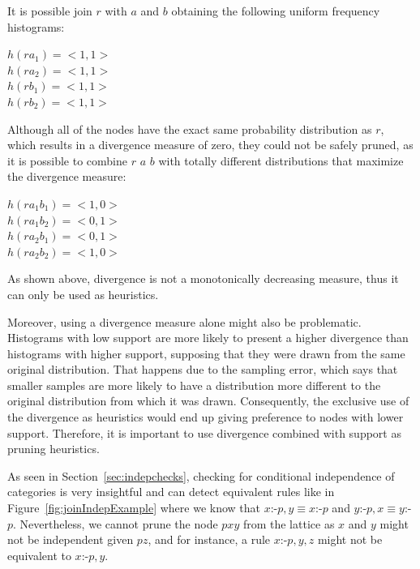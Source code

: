It is possible join $r$ with $a$ and $b$ obtaining the following uniform frequency histograms:

\begin{center}
$h(ra_1)=<1,1>$ \\
$h(ra_2)=<1,1>$ \\
$h(rb_1)=<1,1>$ \\
$h(rb_2)=<1,1>$
\end{center}

Although all of the nodes have the exact same probability distribution as $r$, which results in a divergence measure of
zero, they could not be safely pruned, as it is possible to combine $r$ $a$ $b$ with totally different distributions
that maximize the divergence measure:

\begin{center}
$h(ra_1b_1)=<1,0>$ \\
$h(ra_1b_2)=<0,1>$ \\
$h(ra_2b_1)=<0,1>$ \\
$h(ra_2b_2)=<1,0>$
\end{center}

As shown above, divergence is not a monotonically decreasing measure, thus it can only be used as heuristics.


Moreover, using a divergence measure alone might also be problematic. Histograms with low support are more likely to
present a higher divergence than histograms with higher support, supposing that they were drawn from the same original
distribution. That happens due to the sampling error, which says that smaller samples are more likely to have a
distribution more different to the original distribution from which it was drawn. Consequently, the exclusive use of
the divergence as heuristics would end up giving preference to nodes with lower support. Therefore, it is important to
use divergence combined with support as pruning heuristics.




As seen in Section~\ref{sec:indepchecks}, checking for conditional independence of categories is very insightful
and can detect equivalent rules like in Figure~\ref{fig:joinIndepExample} where we know that 
$x$:-$p,y \equiv x$:-$p$ and $y$:-$p,x \equiv y$:-$p$. Nevertheless, we cannot prune the
node $pxy$ from the lattice as $x$ and $y$ might not be independent given $pz$, and for instance, a rule $x$:-$p,y,z$
might not be equivalent to $x$:-$p,y$.

